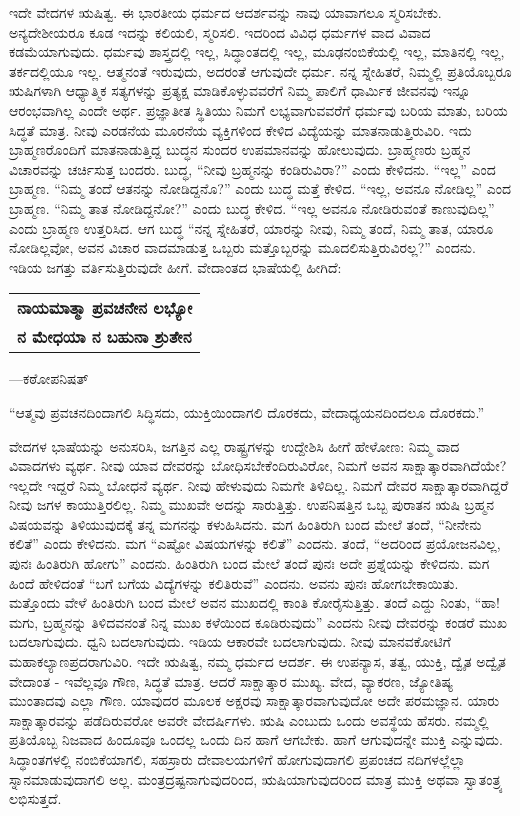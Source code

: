 ಇದೇ ವೇದಗಳ ಋಷಿತ್ವ. ಈ ಭಾರತೀಯ ಧರ್ಮದ ಆದರ್ಶವನ್ನು ನಾವು ಯಾವಾಗಲೂ ಸ್ಮರಿಸಬೇಕು. ಅನ್ಯದೇಶೀಯರೂ ಕೂಡ ಇದನ್ನು ಕಲಿಯಲಿ, ಸ್ಮರಿಸಲಿ. ಇದರಿಂದ ವಿವಿಧ ಧರ್ಮಗಳ ವಾದ ವಿವಾದ ಕಡಮೆಯಾಗುವುದು. ಧರ್ಮವು ಶಾಸ್ತ್ರದಲ್ಲಿ ಇಲ್ಲ, ಸಿದ್ಧಾಂತದಲ್ಲಿ ಇಲ್ಲ, ಮೂಢನಂಬಿಕೆಯಲ್ಲಿ ಇಲ್ಲ, ಮಾತಿನಲ್ಲಿ ಇಲ್ಲ, ತರ್ಕದಲ್ಲಿಯೂ ಇಲ್ಲ. ಆತ್ಮನಂತೆ ಇರುವುದು, ಅದರಂತೆ ಆಗುವುದೇ ಧರ್ಮ. ನನ್ನ ಸ್ನೇಹಿತರೆ, ನಿಮ್ಮಲ್ಲಿ ಪ್ರತಿಯೊಬ್ಬರೂ ಋಷಿಗಳಾಗಿ ಆಧ್ಯಾತ್ಮಿಕ ಸತ್ಯಗಳನ್ನು ಪ್ರತ್ಯಕ್ಷ ಮಾಡಿಕೊಳ್ಳುವವರೆಗೆ ನಿಮ್ಮ ಪಾಲಿಗೆ ಧಾರ್ಮಿಕ ಜೀವನವು ಇನ್ನೂ ಆರಂಭವಾಗಿಲ್ಲ ಎಂದೇ ಅರ್ಥ. ಪ್ರಜ್ಞಾತೀತ ಸ್ಥಿತಿಯು ನಿಮಗೆ ಲಭ್ಯವಾಗುವವರೆಗೆ ಧರ್ಮವು ಬರಿಯ ಮಾತು, ಬರಿಯ ಸಿದ್ಧತೆ ಮಾತ್ರ. ನೀವು ಎರಡನೆಯ ಮೂರನೆಯ ವ್ಯಕ್ತಿಗಳಿಂದ ಕೇಳಿದ ವಿದ್ಯೆಯನ್ನು ಮಾತನಾಡುತ್ತಿರುವಿರಿ. ಇದು ಬ್ರಾಹ್ಮಣರೊಂದಿಗೆ ಮಾತನಾಡುತ್ತಿದ್ದ ಬುದ್ಧನ ಸುಂದರ ಉಪಮಾನವನ್ನು ಹೋಲುವುದು. ಬ್ರಾಹ್ಮಣರು ಬ್ರಹ್ಮನ ವಿಚಾರವನ್ನು ಚರ್ಚಿಸುತ್ತ ಬಂದರು. ಬುದ್ಧ, “ನೀವು ಬ್ರಹ್ಮನನ್ನು ಕಂಡಿರುವಿರಾ?” ಎಂದು ಕೇಳಿದನು. “ಇಲ್ಲ” ಎಂದ ಬ್ರಾಹ್ಮಣ. “ನಿಮ್ಮ ತಂದೆ ಆತನನ್ನು ನೋಡಿದ್ದನೊ?” ಎಂದು ಬುದ್ಧ ಮತ್ತೆ ಕೇಳಿದ. “ಇಲ್ಲ, ಅವನೂ ನೋಡಿಲ್ಲ” ಎಂದ ಬ್ರಾಹ್ಮಣ. “ನಿಮ್ಮ ತಾತ ನೋಡಿದ್ದನೋ?” ಎಂದು ಬುದ್ಧ ಕೇಳಿದ. “ಇಲ್ಲ ಅವನೂ ನೋಡಿರುವಂತೆ ಕಾಣುವುದಿಲ್ಲ” ಎಂದು ಬ್ರಾಹ್ಮಣ ಉತ್ತರಿಸಿದ. ಆಗ ಬುದ್ಧ “ನನ್ನ ಸ್ನೇಹಿತರೆ, ಯಾರನ್ನು ನೀವು, ನಿಮ್ಮ ತಂದೆ, ನಿಮ್ಮ ತಾತ, ಯಾರೂ ನೋಡಿಲ್ಲವೋ, ಅವನ ವಿಚಾರ ವಾದಮಾಡುತ್ತ ಒಬ್ಬರು ಮತ್ತೊಬ್ಬರನ್ನು ಮೂದಲಿಸುತ್ತಿರುವಿರಲ್ಲ?” ಎಂದನು. ಇಡಿಯ ಜಗತ್ತು ವರ್ತಿಸುತ್ತಿರುವುದೇ ಹೀಗೆ. ವೇದಾಂತದ ಭಾಷೆಯಲ್ಲಿ ಹೀಗಿದೆ:

\begin{longtable}{@{}l@{}}
\textbf{ನಾಯಮಾತ್ಮಾ ಪ್ರವಚನೇನ ಲಭ್ಯೋ} \\
\textbf{ನ ಮೇಧಯಾ ನ ಬಹುನಾ ಶ್ರುತೇನ} \\
\end{longtable}

\hfill —ಕಠೋಪನಿಷತ್​

“ಆತ್ಮವು ಪ್ರವಚನದಿಂದಾಗಲಿ ಸಿದ್ಧಿಸದು, ಯುಕ್ತಿಯಿಂದಾಗಲಿ ದೊರಕದು, ವೇದಾಧ್ಯಯನದಿಂದಲೂ ದೊರಕದು.”

ವೇದಗಳ ಭಾಷೆಯನ್ನು ಅನುಸರಿಸಿ, ಜಗತ್ತಿನ ಎಲ್ಲ ರಾಷ್ಟ್ರಗಳನ್ನು ಉದ್ದೇಶಿಸಿ ಹೀಗೆ ಹೇಳೋಣ: ನಿಮ್ಮ ವಾದ ವಿವಾದಗಳು ವ್ಯರ್ಥ. ನೀವು ಯಾವ ದೇವರನ್ನು ಬೋಧಿಸಬೇಕೆಂದಿರುವಿರೋ, ನಿಮಗೆ ಅವನ ಸಾಕ್ಷಾತ್ಕಾರವಾಗಿದೆಯೇ? ಇಲ್ಲದೇ ಇದ್ದರೆ ನಿಮ್ಮ ಬೋಧನೆ ವ್ಯರ್ಥ. ನೀವು ಹೇಳುವುದು ನಿಮಗೇ ತಿಳಿದಿಲ್ಲ. ನಿಮಗೆ ದೇವರ ಸಾಕ್ಷಾತ್ಕಾರವಾಗಿದ್ದರೆ ನೀವು ಜಗಳ ಕಾಯುತ್ತಿರಲಿಲ್ಲ. ನಿಮ್ಮ ಮುಖವೇ ಅದನ್ನು ಸಾರುತ್ತಿತ್ತು. ಉಪನಿಷತ್ತಿನ ಒಬ್ಬ ಪುರಾತನ ಋಷಿ ಬ್ರಹ್ಮನ ವಿಷಯವನ್ನು ತಿಳಿಯುವುದಕ್ಕೆ ತನ್ನ ಮಗನನ್ನು ಕಳುಹಿಸಿದನು. ಮಗ ಹಿಂತಿರುಗಿ ಬಂದ ಮೇಲೆ ತಂದೆ, “ನೀನೇನು ಕಲಿತೆ” ಎಂದು ಕೇಳಿದನು. ಮಗ “ಎಷ್ಟೋ ವಿಷಯಗಳನ್ನು ಕಲಿತೆ” ಎಂದನು. ತಂದೆ, “ಅದರಿಂದ ಪ್ರಯೋಜನವಿಲ್ಲ, ಪುನಃ ಹಿಂತಿರುಗಿ ಹೋಗು” ಎಂದನು. ಹಿಂತಿರುಗಿ ಬಂದ ಮೇಲೆ ತಂದೆ ಪುನಃ ಅದೇ ಪ್ರಶ್ನೆಯನ್ನು ಕೇಳಿದನು. ಮಗ ಹಿಂದೆ ಹೇಳಿದಂತೆ “ಬಗೆ ಬಗೆಯ ವಿದ್ಯೆಗಳನ್ನು ಕಲಿತಿರುವೆ” ಎಂದನು. ಅವನು ಪುನಃ ಹೋಗಬೇಕಾಯಿತು. ಮತ್ತೊಂದು ವೇಳೆ ಹಿಂತಿರುಗಿ ಬಂದ ಮೇಲೆ ಅವನ ಮುಖದಲ್ಲಿ ಕಾಂತಿ ಕೋರೈಸುತ್ತಿತ್ತು. ತಂದೆ ಎದ್ದು ನಿಂತು, “ಹಾ! ಮಗು, ಬ್ರಹ್ಮನನ್ನು ತಿಳಿದವನಂತೆ ನಿನ್ನ ಮುಖ ಕಳೆಯಿಂದ ಕೂಡಿರುವುದು” ಎಂದನು ನೀವು ದೇವರನ್ನು ಕಂಡರೆ ಮುಖ ಬದಲಾಗುವುದು. ಧ್ವನಿ ಬದಲಾಗುವುದು. ಇಡಿಯ ಆಕಾರವೇ ಬದಲಾಗುವುದು. ನೀವು ಮಾನವಕೋಟಿಗೆ ಮಹಾಕಲ್ಯಾಣಪ್ರದರಾಗುವಿರಿ. ಇದೇ ಋಷಿತ್ವ, ನಮ್ಮ ಧರ್ಮದ ಆದರ್ಶ. ಈ ಉಪನ್ಯಾಸ, ತತ್ವ, ಯುಕ್ತಿ, ದ್ವೈತ ಅದ್ವೈತ ವೇದಾಂತ - ಇವೆಲ್ಲವೂ ಗೌಣ, ಸಿದ್ಧತೆ ಮಾತ್ರ. ಆದರೆ ಸಾಕ್ಷಾತ್ಕಾರ ಮುಖ್ಯ. ವೇದ, ವ್ಯಾಕರಣ, ಜ್ಯೋತಿಷ್ಯ ಮುಂತಾದವು ಎಲ್ಲಾ ಗೌಣ. ಯಾವುದರ ಮೂಲಕ ಅಕ್ಷರವು ಸಾಕ್ಷಾತ್ಕಾರವಾಗುವುದೋ ಅದೇ ಪರಮಜ್ಞಾನ. ಯಾರು ಸಾಕ್ಷಾತ್ಕಾರವನ್ನು ಪಡೆದಿರುವರೋ ಅವರೇ ವೇದರ್ಷಿಗಳು. ಋಷಿ ಎಂಬುದು ಒಂದು ಅವಸ್ಥೆಯ ಹೆಸರು. ನಮ್ಮಲ್ಲಿ ಪ್ರತಿಯೊಬ್ಬ ನಿಜವಾದ ಹಿಂದೂವೂ ಒಂದಲ್ಲ ಒಂದು ದಿನ ಹಾಗೆ ಆಗಬೇಕು. ಹಾಗೆ ಆಗುವುದನ್ನೇ ಮುಕ್ತಿ ಎನ್ನುವುದು. ಸಿದ್ಧಾಂತಗಳಲ್ಲಿ ನಂಬಿಕೆಯಾಗಲಿ, ಸಹಸ್ರಾರು ದೇವಾಲಯಗಳಿಗೆ ಹೋಗುವುದಾಗಲಿ ಪ್ರಪಂಚದ ನದಿಗಳಲ್ಲೆಲ್ಲಾ ಸ್ನಾನಮಾಡುವುದಾಗಲಿ ಅಲ್ಲ. ಮಂತ್ರದ್ರಷ್ಟನಾಗುವುದರಿಂದ, ಋಷಿಯಾಗುವುದರಿಂದ ಮಾತ್ರ ಮುಕ್ತಿ ಅಥವಾ ಸ್ವಾತಂತ್ರ್ಯ ಲಭಿಸುತ್ತದೆ.

